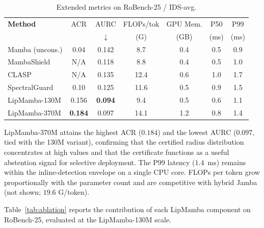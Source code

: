 \documentclass[journal,a4paper,10pt]{IEEEtran}
\theoremstyle{definition}
\theoremstyle{remark}
\newcommand{\modelname}{LipMamba}
\begin{document}
\begin{table}[!t]
\centering
\caption{Extended metrics on RoBench-25 / IDS-avg.}
\label{tab:extended}
\small
\begin{tabular}{@{}lcccccc@{}}
\toprule
\textbf{Method} & ACR & AURC & FLOPs/tok & GPU Mem. & P50 & P99 \\
& & $\downarrow$ & (G) & (GB) & (ms) & (ms) \\
\midrule
Mamba (uncons.) & 0.04 & 0.142 & 8.7 & 0.4 & 0.5 & 0.9 \\
MambaShield~\cite{anaedevha2025mambashield} & N/A & 0.118 & 8.8 & 0.4 & 0.5 & 1.0 \\
CLASP~\cite{lemercier2026clasp} & N/A & 0.135 & 12.4 & 0.6 & 1.0 & 1.7 \\
SpectralGuard~\cite{lemercier2026spectralguard} & 0.10 & 0.125 & 11.6 & 0.5 & 0.9 & 1.5 \\
\midrule
\modelname{}-130M & 0.156 & \textbf{0.094} & 9.4 & 0.5 & 0.6 & 1.1 \\
\modelname{}-370M & \textbf{0.184} & 0.097 & 14.1 & 1.2 & 0.8 & 1.4 \\
\bottomrule
\end{tabular}
\end{table}

\modelname{}-370M attains the highest ACR ($0.184$) and the lowest AURC ($0.097$, tied with the 130M variant), confirming that the certified radius distribution concentrates at high values and that the certificate functions as a useful abstention signal for selective deployment. The P99 latency ($1.4$~ms) remains within the inline-detection envelope on a single CPU core. FLOPs per token grow proportionally with the parameter count and are competitive with hybrid Jamba (not shown; $19.6$ G/token).




Table~\ref{tab:ablation} reports the contribution of each \modelname{} component on RoBench-25, evaluated at the LipMamba-130M scale.
\end{document}
